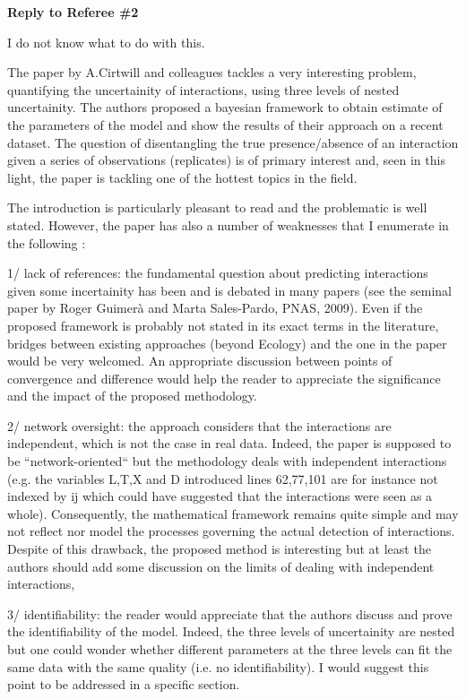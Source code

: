 \documentclass[12pt]{letter}
\newenvironment{refquote}{\bigskip \begin{it}}{\end{it}\smallskip}
\begin{document}
{\Large \bf Reply to Referee \#2}

	I do not know what to do with this.

	\begin{refquote}
	The paper by A.Cirtwill and colleagues tackles a very interesting problem, quantifying the uncertainity of interactions, using three levels of nested uncertainity. The authors proposed a bayesian framework to obtain estimate of the parameters of the model and show the results of their approach on a recent dataset. The question of disentangling the true presence/absence of an interaction given a series of observations (replicates) is of primary interest and, seen in this light, the paper is tackling one of the hottest topics in the field.

	The introduction is particularly pleasant to read and the problematic is well stated. However, the paper has also a number of weaknesses that I enumerate in the following :

	1/ lack of references: the fundamental question about predicting interactions given some incertainity has been and is debated in many papers (see the seminal paper by Roger Guimerà and Marta Sales-Pardo, PNAS, 2009). Even if the proposed framework is probably not stated in its exact terms in the literature, bridges between existing approaches (beyond Ecology) and the one in the paper would be very welcomed. An appropriate discussion between points of convergence and difference would help the reader to appreciate the significance and the impact of the proposed methodology.

	2/ network oversight: the approach considers that the interactions are independent, which is not the case in real data. Indeed, the paper is supposed to be “network-oriented“ but the methodology deals with independent interactions (e.g. the variables L,T,X and D introduced lines 62,77,101 are for instance not indexed by ij which could have suggested that the interactions were seen as a whole). Consequently, the mathematical framework remains quite simple and may not reflect nor model the processes governing the actual detection of interactions. Despite of this drawback, the proposed method is interesting but at least the authors should add some discussion on the limits of dealing with independent interactions,

	3/ identifiability: the reader would appreciate that the authors discuss and prove the identifiability of the model. Indeed, the three levels of uncertainity are nested but one could wonder whether different parameters at the three levels can fit the same data with the same quality (i.e. no identifiability).  I would suggest this point to be addressed in a specific section.


\end{refquote}
\end{document}
